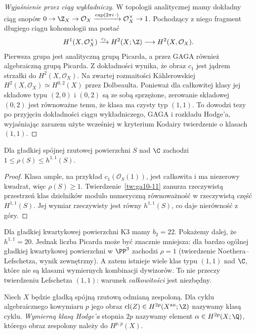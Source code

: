 \begin{proof}[Wyjaśnienie przez ciąg wykładniczy]
W topologii analitycznej mamy dokładny ciąg snopów
$0\to\Z_X\to\mathcal O_X\xrightarrow{\exp(2\pi i\,\cdot)}
\mathcal O_X^{\times}\to1$.
Pochodzący z niego fragment długiego ciągu kohomologii
ma postać
\[
 H^1(X,\mathcal O_X^{\times})\xrightarrow{c_1}
 H^2(X;\Z)\longrightarrow H^2(X,\mathcal O_X).
\]
Pierwsza grupa jest analityczną grupą Picarda,
a przez GAGA również algebraiczną grupą Picarda.
Z dokładności wynika, że obraz $c_1$ jest jądrem
strzałki do $H^2(X,\mathcal O_X)$.
Na zwartej rozmaitości Kählerowskiej
$H^2(X,\mathcal O_X)\simeq H^{0,2}(X)$ przez Dolbeaulta.
Ponieważ dla całkowitej klasy jej składowe typu $(2,0)$
i $(0,2)$ są ze sobą sprzężone, zerowanie składowej
$(0,2)$ jest równoważne temu, że klasa ma czysty typ $(1,1)$.
To dowodzi tezy po przyjęciu dokładności ciągu wykładniczego,
GAGA i rozkładu Hodge'a, wyjaśniając zarazem użyte wcześniej
w kryterium Kodairy twierdzenie o klasach $(1,1)$.
\end{proof}

\begin{wniosek}
\label{wn:ga10-rho}
Dla gładkiej spójnej rzutowej powierzchni $S$ nad $\C$
zachodzi $1\le\rho(S)\le h^{1,1}(S)$.
\end{wniosek}
\begin{proof}
Klasa ample, na przykład $c_1(\mathcal O_S(1))$,
jest całkowita i ma niezerowy kwadrat, więc
$\rho(S)\ge1$.
Twierdzenie~\ref{tw:ga10-11} zanurza rzeczywistą
przestrzeń klas dzielników modulo numeryczną równoważność
w rzeczywistą część $H^{1,1}(S)$.
Jej wymiar rzeczywisty jest równy $h^{1,1}(S)$,
co daje nierówność z góry.
\end{proof}

\begin{przyklad}
Dla gładkiej kwartykowej powierzchni K3 mamy
$b_2=22$. Pokażemy dalej, że $h^{1,1}=20$.
Jednak liczba Picarda może być znacznie mniejsza:
dla bardzo ogólnej gładkiej kwartykowej powierzchni
w $\PP^3$ zachodzi $\rho=1$ (twierdzenie
Noethera--Lefschetza, wynik zewnętrzny).
A zatem istnieje wiele klas typu $(1,1)$ nad $\C$,
które nie są klasami wymiernych kombinacji dywizorów.
To nie przeczy twierdzeniu Lefschetza $(1,1)$:
warunek \emph{całkowitości} jest niezbędny.
\end{przyklad}

\begin{definicja}
Niech $X$ będzie gładką spójną rzutową odmianą zespoloną.
Dla cyklu algebraicznego kowymiaru $p$ jego obraz
$\operatorname{cl}(Z)\in H^{2p}(X^{\rm an};\Z)$
nazywamy klasą cyklu. \emph{Wymierną klasą Hodge'a}
stopnia $2p$ nazywamy element
$\alpha\in H^{2p}(X;\Q)$, którego obraz zespolony
należy do $H^{p,p}(X)$.
\end{definicja}

